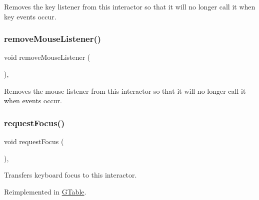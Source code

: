 Removes the key listener from this interactor so that it will no longer call it when key events occur. 

\mbox{\label{classGInteractor_aff47f71ce47e688a07c9d38dc92fcc11}} 
\subsubsection{\texorpdfstring{remove\+Mouse\+Listener()}{removeMouseListener()}}
{\footnotesize\ttfamily void remove\+Mouse\+Listener (\begin{DoxyParamCaption}{ }\end{DoxyParamCaption})\hspace{0.3cm}{\ttfamily [virtual]}, {\ttfamily [inherited]}}



Removes the mouse listener from this interactor so that it will no longer call it when events occur. 

\mbox{\label{classGInteractor_a519fb2ac767f8b2febbb50b898b8c8cb}} 
\subsubsection{\texorpdfstring{request\+Focus()}{requestFocus()}}
{\footnotesize\ttfamily void request\+Focus (\begin{DoxyParamCaption}{ }\end{DoxyParamCaption})\hspace{0.3cm}{\ttfamily [virtual]}, {\ttfamily [inherited]}}



Transfers keyboard focus to this interactor. 



Reimplemented in \mbox{\hyperlink{classGTable_a5921efd0a5a83eacebdadb749fb3ea7a}{G\+Table}}.

\mbox{\label{classGInteractor_ad15f102f62e2960576012f1aa0ba4b2e}} 
